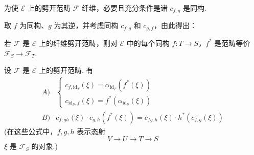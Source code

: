 \begin{proposition}\label{prop:VI.7.2}
为使 $\mathcal{E}$ 上的劈开范畴 $\mathcal{F}$ 纤维，必要且充分条件是诸 $c_{f,g}$ 是同构.
\end{proposition}

取 $f$ 为同构、$g$ 为其逆，并考虑同构 $c_{f,g}$ 和 $c_{g,f}$，由此得出：

\begin{corollary}\label{cor:VI.7.3}
若 $\mathcal{F}$ 是 $\mathcal{E}$ 上的纤维劈开范畴，则对 $\mathcal{E}$ 中的每个同构 $f \colon T \to S$，$f^{*}$ 是范畴等价 $\mathcal{F}_S \to \mathcal{F}_T$.
\end{corollary}

\begin{proposition}\label{prop:VI.7.4}
设 $\mathcal{F}$ 是 $\mathcal{E}$ 上的劈开范畴. 有
\[
\begin{array}{ll}
A) & \left\{ \begin{array}{l}
c_{f,\mathrm{id}_T}(\xi) = \alpha_{\mathrm{id}_T}(f^{*}(\xi)) \\
c_{\mathrm{id}_S,f}(\xi) = f^{*}(\alpha_{\mathrm{id}_S}(\xi))
\end{array} \right. \\
B) & c_{f,gh}(\xi) \cdot c_{g,h}(f^{*}(\xi)) = c_{fg,h}(\xi) \cdot h^{*}(c_{f,g}(\xi))
\end{array}
\]
(在这些公式中，$f, g, h$ 表示态射
\begin{equation}
V \longrightarrow U \longrightarrow T \longrightarrow S \tag{173}
\label{eq:VI.173}
\end{equation}
$\xi$ 是 $\mathcal{F}_S$ 的对象.)
\end{proposition}

